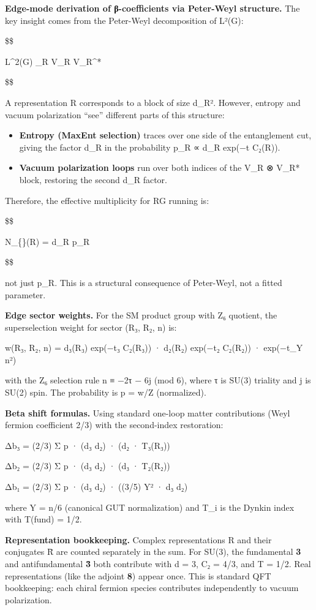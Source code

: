 \documentclass[11pt,a4paper]{article}
\theoremstyle{remark}
\begin{document}
\textbf{Edge-mode derivation of β-coefficients via Peter-Weyl structure.} The key insight comes from the Peter-Weyl decomposition of L²(G):

\$\$

L\^{}2(G) \simeq \bigoplus\_R V\_R \otimes V\_R\^{}*

\$\$

A representation R corresponds to a block of size d\_R². However, entropy and vacuum polarization ``see'' different parts of this structure:

\begin{itemize}
\item
  \textbf{Entropy (MaxEnt selection)} traces over one side of the entanglement cut, giving the factor d\_R in the probability p\_R ∝ d\_R exp(−t C₂(R)).
\item
  \textbf{Vacuum polarization loops} run over both indices of the V\_R ⊗ V\_R* block, restoring the second d\_R factor.
\end{itemize}

Therefore, the effective multiplicity for RG running is:

\$\$

N\_\{\}(R) = d\_R \cdot p\_R

\$\$

not just p\_R. This is a structural consequence of Peter-Weyl, not a fitted parameter.

\textbf{Edge sector weights.} For the SM product group with Z₆ quotient, the superselection weight for sector (R₃, R₂, n) is:

w(R₃, R₂, n) = d₃(R₃) exp(−t₃ C₂(R₃)) · d₂(R₂) exp(−t₂ C₂(R₂)) · exp(−t\_Y n²)

with the Z₆ selection rule n ≡ −2τ − 6j (mod 6), where τ is SU(3) triality and j is SU(2) spin. The probability is p = w/Z (normalized).

\textbf{Beta shift formulas.} Using standard one-loop matter contributions (Weyl fermion coefficient 2/3) with the second-index restoration:

Δb₃ = (2/3) Σ p · (d₃ d₂) · (d₂ · T₃(R₃))

Δb₂ = (2/3) Σ p · (d₃ d₂) · (d₃ · T₂(R₂))

Δb₁ = (2/3) Σ p · (d₃ d₂) · ((3/5) Y² · d₃ d₂)

where Y = n/6 (canonical GUT normalization) and T\_i is the Dynkin index with T(fund) = 1/2.

\textbf{Representation bookkeeping.} Complex representations R and their conjugates R̄ are counted separately in the sum. For SU(3), the fundamental \textbf{3} and antifundamental \textbf{3̄} both contribute with d = 3, C₂ = 4/3, and T = 1/2. Real representations (like the adjoint \textbf{8}) appear once. This is standard QFT bookkeeping: each chiral fermion species contributes independently to vacuum polarization.
\end{document}
